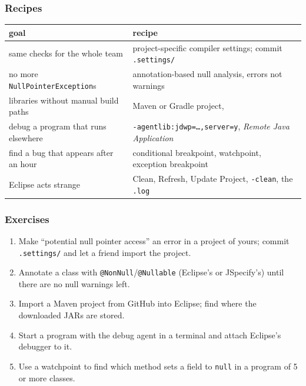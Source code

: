 \documentclass[aspectratio=169,10pt,compress]{beamer}
\begin{document}
\begin{frame}[t,fragile] \frametitle{Recipes}
  \begin{center}\footnotesize
  \begin{tabular}{@{}L{0.36\textwidth}L{0.58\textwidth}@{}}
    \toprule
    \textbf{goal}                              & \textbf{recipe} \\
    \midrule
    same checks for the whole team             & project-specific compiler settings; commit \texttt{.settings/} \\
    no more \texttt{NullPointerException}s     & annotation-based null analysis, errors not warnings \\
    libraries without manual build paths       & Maven or Gradle project,  \\
    debug a program that runs elsewhere        & \texttt{-agentlib:jdwp=\dots,server=y}, \emph{Remote Java Application} \\
    find a bug that appears after an hour      & conditional breakpoint, watchpoint, exception breakpoint \\
    Eclipse acts strange                       & Clean, Refresh, Update Project, \texttt{-clean}, the \texttt{.log} \\
    \bottomrule
  \end{tabular}
  \end{center}
\end{frame}




\begin{frame}[t,fragile] \frametitle{Exercises}
  \begin{enumerate}\small
    \item Make ``potential null pointer access'' an error in a project of yours; commit \texttt{.settings/} and let a friend import the project.
    \item Annotate a class with \texttt{@NonNull}/\texttt{@Nullable} (Eclipse's or JSpecify's) until there are no null warnings left.
    \item Import a Maven project from GitHub into Eclipse; find where the downloaded JARs are stored.
    \item Start a program with the debug agent in a terminal and attach Eclipse's debugger to it.
    \item Use a watchpoint to find which method sets a field to \texttt{null} in a program of 5 or more classes.
  \end{enumerate}
\end{frame}




\begin{frame}[t,fragile]
	\begin{center}
		\vspace{4cm}
	\end{center}
\end{frame}
\end{document}
